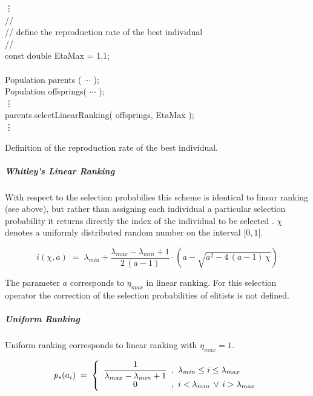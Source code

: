 \begin{example}[!htb]
\begin{shortlisting}
            \vdots\\
//\\
// {\rm define the reproduction rate of the best individual}\\
//\\
const double EtaMax = 1.1;\\
\\
Population parents   ( $\cdots$ );\\
Population offsprings( $\cdots$ );\\
            \vdots\\
parents.selectLinearRanking( offsprings, EtaMax );\\
            \vdots\\
\end{shortlisting}
\vspace*{-10pt}\caption[Definition of the Reproduction Rate of the Best
Individual]{Definition of the reproduction rate of the best
individual.}
\end{example}

\subparagraph{Whitley's Linear Ranking} %

With respect to the selection probabilies this scheme is identical to
linear ranking (see above), but rather than assigning each individual
a particular selection probability it returns directly the index of
the individual to be selected \cite{Whitley:89}.  $\chi$ denotes a
uniformly distributed random number on the interval $[0,1[$.

\begin{equation}
    i(\chi,a) \; = \; \lambda_{min} + \frac{\lambda_{max}-\lambda_{min}+1}
                {2\,(a-1)}\cdot
                \left(a - \sqrt{a^2 - 4\,(a-1)\,\chi} \right)
\end{equation}

The parameter $a$ corresponds to $\eta_{max}$ in linear ranking.  For
this selection operator the correction of the selection probabilities
of elitists is not defined.

\subparagraph{Uniform Ranking}

Uniform ranking corresponds to linear ranking with $\eta_{max}=1$.

\begin{equation}
    p_s(a_i) \; = \; \left\{
    \begin{array}{c@{\hspace{0.5em},\hspace{0.5em}}l}
      \displaystyle\frac{1}{\lambda_{max}-\lambda_{min}+1}
        & \lambda_{min} \le i \le \lambda_{max} \\[0.3em]
      0 & i < \lambda_{min} \, \vee \, i > \lambda_{max}
    \end{array}
  \right.
\end{equation}

